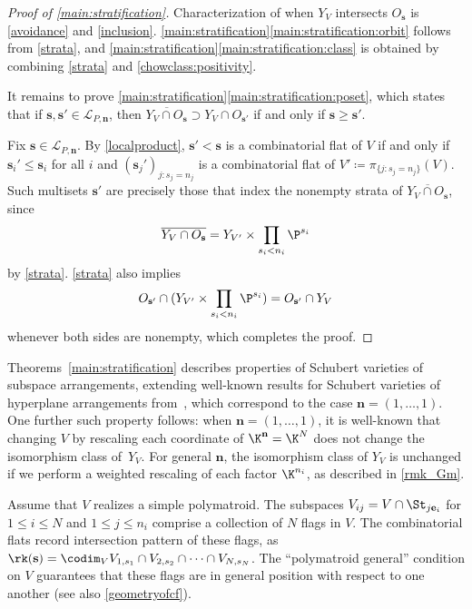 \begin{proof}[Proof of \cref{main:stratification}]
  Characterization of when $Y_V$ intersects $O_{\mathbf s}$ is \cref{avoidance} and \cref{inclusion}.
  \cref{main:stratification}\cref{main:stratification:orbit} follows from \cref{strata}, and \cref{main:stratification}\cref{main:stratification:class} is obtained by combining \cref{strata} and \cref{chowclass:positivity}.

  It remains to prove \cref{main:stratification}\cref{main:stratification:poset}, which states that if $\mathbf s, \mathbf s' \in \mathcal L_{P, \mathbf n}$, then  $\overline{Y_V \cap O_{\mathbf s}} \supset Y_V \cap O_{\mathbf s'}$ if and only if $\mathbf s \geq \mathbf s'$.
  
  Fix $\mathbf s \in \mathcal L_{P, \mathbf n}$.
  By \cref{localproduct}, $\mathbf s' < \mathbf s$ is a combinatorial flat of $V$ if and only if $\mathbf s_i' \leq \mathbf s_i$ for all $i$ and $(\mathbf s_j')_{j :s_j = n_j}$ is a combinatorial flat of $V' \coloneqq \pi_{\{j : s_j = n_j\}}(V)$. 
  Such multisets $\mathbf s'$ are precisely those that index the nonempty strata of $\overline{Y_V \cap O_{\mathbf s}}$, since 
  \[
  \overline{Y_V \cap O_{\mathbf s}} = Y_{V'} \times \prod_{s_i < n_i} \P^{s_i}
  \]
  by \cref{strata}.
\cref{strata} also implies  
\[
O_{\mathbf s'} \cap (Y_{V'} \times \prod_{s_i < n_i} \P^{s_i}) = O_{\mathbf s'} \cap Y_V
\]
whenever both sides are nonempty, which completes the proof.
\end{proof}

\begin{rema}
  Theorems~\ref{main:stratification} describes properties of Schubert varieties of subspace arrangements, extending well-known results for Schubert varieties of hyperplane arrangements from~\cite{AB16}, which correspond to the case $\mathbf n = (1, \ldots, 1)$.
  One further such property follows: when $\mathbf n = (1, \ldots, 1)$,  it is well-known that changing $V$ by rescaling each coordinate of $\K^{\mathbf n} = \K^N$ does not change the isomorphism class of~$Y_V$.
  For general $\mathbf n$, the isomorphism class of $Y_V$ is unchanged if we perform a weighted rescaling of each factor $\K^{n_i}$, as described in \cref{rmk_Gm}.
\end{rema}
\begin{rema}\label{flagperspective}
  Assume that $V$ realizes a simple polymatroid.
  The subspaces $V_{ij} = V \cap \St_{j \mathbf e_i}$ for $1 \leq i \leq N$ and $1 \leq j \leq n_i$ comprise a collection of $N$ flags in $V$. The combinatorial flats record intersection pattern of these flags, as $\rk(\mathbf s) = \codim_V V_{1,s_1} \cap V_{2,s_2} \cap \cdots \cap V_{N,s_N}$.
The ``polymatroid general'' condition on $V$ guarantees that these flags are in general position with respect to one another (see also \cref{geometryofcf}).
\end{rema}

